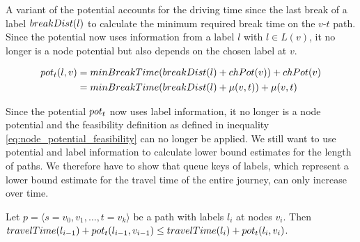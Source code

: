 A variant of the potential accounts for the driving time since the last break of a label $breakDist(l)$ to calculate the minimum required break time on the $v$-$t$ path. Since the potential now uses information from a label $l$ with $l \in L(v)$, it no longer is a node potential but also depends on the chosen label at $v$.

\begin{align}
	\begin{split}
		pot_t(l,v) & = minBreakTime(breakDist(l) + chPot(v)) +chPot(v) \\
		& = minBreakTime(breakDist(l) + \mu(v,t)) + \mu(v,t)
	\end{split}
\end{align}

Since the potential $pot_t$ now uses label information, it no longer is a node potential and the feasibility definition as defined in inequality \ref{eq:node_potential_feasibility} can no longer be applied. We still want to use potential and label information to calculate lower bound estimates for the length of paths. We therefore have to show that queue keys of labels, which represent a lower bound estimate for the travel time of the entire journey, can only increase over time.

\begin{lemma}\label{lemma:pot_labels_get_larger}
	Let $p = \langle s=v_0,v_1,\ldots,t=v_k \rangle$ be a path with labels $l_i$ at nodes $v_i$. Then $travelTime(l_{i-1}) + pot_t(l_{i-1},v_{i-1}) \le travelTime(l_i) + pot_t(l_i,v_i)$.
\end{lemma}


